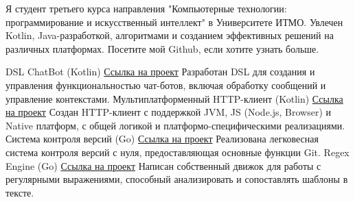 \documentclass[10pt]{developercv} %
\begin{document}
\begin{minipage}[t]{0.4\textwidth} %
	\vspace{-\baselineskip} %
	Я студент третьего курса направления "Компьютерные технологии: программирование и искусственный интеллект" в Университете ИТМО. Увлечен Kotlin, Java-разработкой, алгоритмами и созданием эффективных решений на различных платформах.
    Посетите мой Github, если хотите узнать больше.
\end{minipage}
\hfill %
\begin{minipage}[t]{0.5\textwidth} %
	\vspace{-\baselineskip} %

	\begin{barchart}{5.5} %
	\end{barchart}
\end{minipage}

\begin{center}
\end{center}



\begin{entrylist}
	\entry
		{} %
		{DSL ChatBot (Kotlin)} %
		{\href{https://github.com/gs0xa19f2/ITMO/tree/main/Kotlin/ChatBotDSL}{Ссылка на проект}} %
		{Разработан DSL для создания и управления функциональностью чат-ботов, включая обработку сообщений и управление контекстами.}
	\entry
		{} %
		{Мультиплатформенный HTTP-клиент (Kotlin)} %
		{\href{https://github.com/gs0xa19f2/ITMO/tree/main/Kotlin/MultiplatformClient}{Ссылка на проект}} %
		{Создан HTTP-клиент с поддержкой JVM, JS (Node.js, Browser) и Native платформ, с общей логикой и платформо-специфическими реализациями.}
    \entry
		{} %
		{Система контроля версий (Go)} %
		{\href{https://github.com/gs0xa19f2/Hyperskill/tree/main/Projects/Go/Version\%20Control\%20System\%20}{Ссылка на проект}} %
		{Реализована легковесная система контроля версий с нуля, предоставляющая основные функции Git.}
    \entry
		{} %
		{Regex Engine (Go)} %
		{\href{https://github.com/gs0xa19f2/Hyperskill/tree/main/Projects/Go/Regex\%20Engine\%20}{Ссылка на проект}} %
		{Написан собственный движок для работы с регулярными выражениями, способный анализировать и сопоставлять шаблоны в тексте.}
\end{entrylist}
\end{document}
